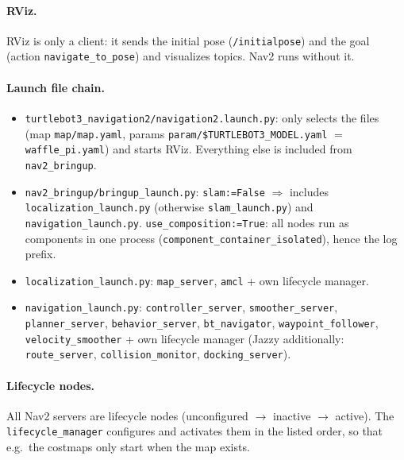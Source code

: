 \documentclass[10pt]{article}
\newcommand{\pkg}[1]{\texttt{#1}}
\begin{document}
\paragraph{RViz.} RViz is only a client: it sends the initial pose (\pkg{/initialpose}) and the goal
(action \pkg{navigate\_to\_pose}) and visualizes topics. Nav2 runs without it.

\paragraph{Launch file chain.}
\begin{itemize}
  \item \pkg{turtlebot3\_navigation2/navigation2.launch.py}: only selects the files
        (map \pkg{map/map.yaml}, params \pkg{param/\$TURTLEBOT3\_MODEL.yaml} $=$ \pkg{waffle\_pi.yaml})
        and starts RViz. Everything else is included from \pkg{nav2\_bringup}.
  \item \pkg{nav2\_bringup/bringup\_launch.py}: \pkg{slam:=False} $\Rightarrow$ includes
        \pkg{localization\_launch.py} (otherwise \pkg{slam\_launch.py}) and \pkg{navigation\_launch.py}.
        \pkg{use\_composition:=True}: all nodes run as components in one process
        (\pkg{component\_container\_isolated}), hence the log prefix.
  \item \pkg{localization\_launch.py}: \pkg{map\_server}, \pkg{amcl} + own lifecycle manager.
  \item \pkg{navigation\_launch.py}: \pkg{controller\_server}, \pkg{smoother\_server}, \pkg{planner\_server},
        \pkg{behavior\_server}, \pkg{bt\_navigator}, \pkg{waypoint\_follower}, \pkg{velocity\_smoother}
        + own lifecycle manager (Jazzy additionally: \pkg{route\_server}, \pkg{collision\_monitor}, \pkg{docking\_server}).
\end{itemize}

\paragraph{Lifecycle nodes.} All Nav2 servers are lifecycle nodes
(unconfigured $\rightarrow$ inactive $\rightarrow$ active). The \pkg{lifecycle\_manager} configures and
activates them in the listed order, so that e.g.\ the costmaps only start when the map exists.
\end{document}
